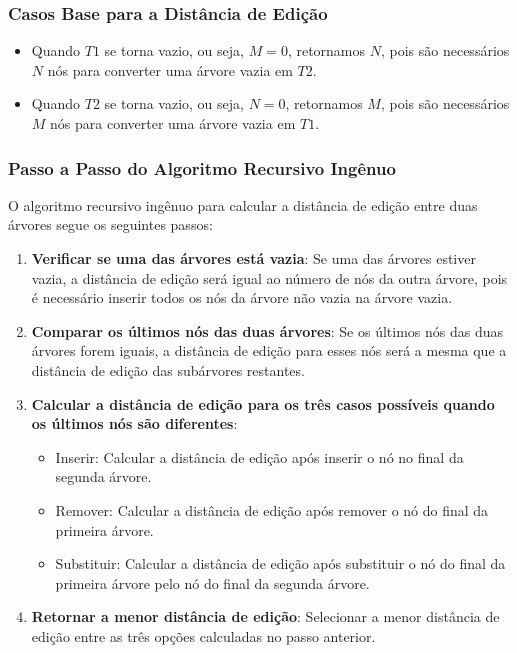 \documentclass[12pt]{article}
\begin{document}
\subsubsection{Casos Base para a Distância de Edição}

\begin{itemize}
    \item Quando \( T1 \) se torna vazio, ou seja, \( M = 0 \), retornamos \( N \), pois são necessários \( N \) nós para converter uma árvore vazia em \( T2 \).
    \item Quando \( T2 \) se torna vazio, ou seja, \( N = 0 \), retornamos \( M \), pois são necessários \( M \) nós para converter uma árvore vazia em \( T1 \).
\end{itemize}

\subsubsection{Passo a Passo do Algoritmo Recursivo Ingênuo}

O algoritmo recursivo ingênuo para calcular a distância de edição entre duas árvores segue os seguintes passos:

\begin{enumerate}
    \item \textbf{Verificar se uma das árvores está vazia}: Se uma das árvores estiver vazia, a distância de edição será igual ao número de nós da outra árvore, pois é necessário inserir todos os nós da árvore não vazia na árvore vazia.
    \item \textbf{Comparar os últimos nós das duas árvores}: Se os últimos nós das duas árvores forem iguais, a distância de edição para esses nós será a mesma que a distância de edição das subárvores restantes.
    \item \textbf{Calcular a distância de edição para os três casos possíveis quando os últimos nós são diferentes}: 
    \begin{itemize}
        \item Inserir: Calcular a distância de edição após inserir o nó no final da segunda árvore.
        \item Remover: Calcular a distância de edição após remover o nó do final da primeira árvore.
        \item Substituir: Calcular a distância de edição após substituir o nó do final da primeira árvore pelo nó do final da segunda árvore.
    \end{itemize}
    \item \textbf{Retornar a menor distância de edição}: Selecionar a menor distância de edição entre as três opções calculadas no passo anterior.
\end{enumerate}
\end{document}
